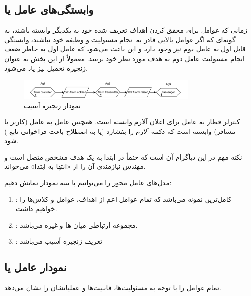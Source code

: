 \subsection{وابستگی‌های عامل یا }

زمانی که عوامل برای محقق کردن اهداف تعریف شده خود به یکدیگر وابسته باشند، به
گونه‌ای که اگر عوامل بالایی قادر به انجام مسئولیت و وظیفه خود نباشند، وابستگی
قابل اول به عامل دوم نیز وجود دارد و این باعث می‌شود که عامل اول به خاطر ضعف
انجام مسئولیت عامل دوم به هدف مورد نظر خود نرسد. معمولاً از این بخش به عنوان
زنجیره تحمیل نیز یاد می‌شود.

\begin{figure}[H]
    \centering
    \includegraphics[width=0.8\textwidth]{assets/agent_dependencies.drawio.pdf}
    \caption{نمودار زنجیره آسیب}
\end{figure}

کنترلر قطار به عامل  برای اعلان آلارم وابسته است. همچنین
عامل  به عامل (کاربر یا مسافر) وابسته است که دکمه آلارم را
بفشارد (یا به اصطلاح باعث فراخوانی تابع ) شود.

نکته مهم در این دیاگرام آن است که حتماً در ابتدا به یک هدف مشخص متصل است و مهندس
نیازمندی آن را از «انتها به ابتدا» می‌خواند.

مدل‌های عامل محور را می‌توانیم با سه نمودار نمایش دهیم:

\begin{enumerate}
    \item {}: کامل‌ترین نمونه می‌باشد که تمام عوامل اعم از
    اهداف، عوامل و کلاس‌ها را خواهیم داشت.
    \item {}: مجموعه ارتباطی میان ها و غیره
    می‌باشد.
    \item {}: تعریف زنجیره آسیب می‌باشد.
\end{enumerate}

\subsection{نمودار عامل یا }

تمام عوامل را با توجه به مسئولیت‌ها، قابلیت‌ها و عملیاتشان را نشان می‌دهد.

